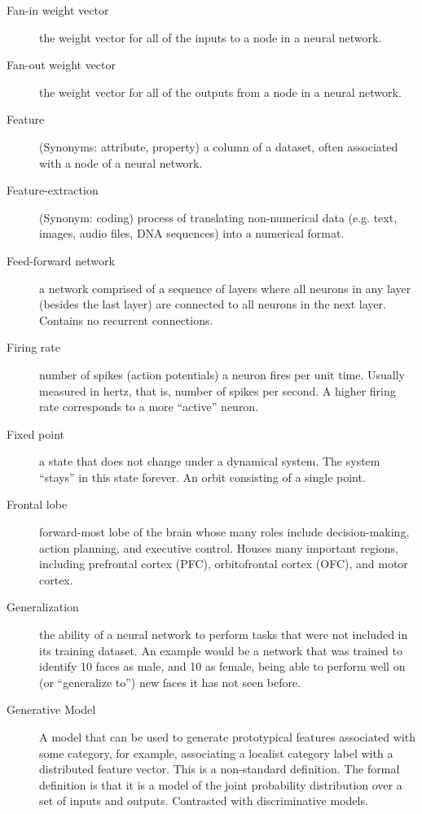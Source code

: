 \begin{description}
\item[Fan-in weight vector] the weight vector for all of the inputs to a node in a neural network.

\item[Fan-out weight vector] the weight vector for all of the outputs from a node in a neural network.

\item[Feature] (Synonyms: attribute, property) a column of a dataset, often associated with a node of a neural network.

\item[Feature-extraction] (Synonym:  coding)  process of translating non-numerical data (e.g. text, images, audio files, DNA sequences) into a numerical format. %

\item[Feed-forward network] a network comprised of a sequence of layers where all neurons in any layer (besides the last layer) are connected to all neurons in the next layer. Contains no recurrent connections.

\item[Firing rate] number of spikes (action potentials) a neuron fires per unit time. Usually measured in hertz, that is, number of spikes per second. A higher firing rate corresponds to a more ``active'' neuron. 

\item[Fixed point] a state that does not change under a dynamical system. The system ``stays'' in this state forever. An orbit consisting of a single point.

\item[Frontal lobe] forward-most lobe of the brain whose many roles include decision-making, action planning, and executive control. Houses many important regions, including prefrontal cortex (PFC), orbitofrontal cortex (OFC), and motor cortex. 


\item[Generalization] the ability of a neural network to perform tasks that were not included in its training dataset. An example would be a network that was trained to identify 10 faces as male, and 10 as female, being able to perform well on (or ``generalize to'') new faces it has not seen before.

\item[Generative Model] A model that can be used to generate prototypical features associated with some category, for example, associating a localist category label with a distributed feature vector. This is a non-standard definition. The formal definition is that it is a model of the joint probability distribution over a set of inputs and outputs. Contrasted with discriminative models. 


\end{description}
